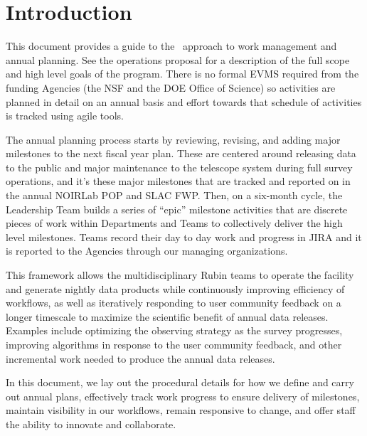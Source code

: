\section{Introduction}

This document provides a guide to the \VRO\ approach to work management and annual planning.
See the operations proposal  for a description of the full scope and high level goals of the program.
There is no formal \gls{EVMS} required from the funding Agencies (the \gls{NSF} and the \gls{DOE} Office of Science) so activities are planned in detail on an annual basis and effort towards that schedule of activities is tracked using agile tools.

The annual planning process starts by reviewing, revising, and adding major milestones to the next fiscal year plan.
These are centered around releasing data to the public and major maintenance to the telescope system during full survey operations, and it's these major milestones that are tracked and reported on in the annual \gls{NOIRLab} \gls{POP} and \gls{SLAC} \gls{FWP}.
Then, on a six-month \gls{cycle}, the Leadership Team builds a series of ``epic'' milestone activities that are discrete pieces of work within Departments and Teams to collectively deliver the high level milestones.
Teams record their day to day work and progress in \gls{JIRA} and it is reported to the Agencies through our managing organizations.

This framework allows the multidisciplinary Rubin teams to operate the facility and generate nightly data products while continuously improving efficiency of workflows,
as well as iteratively responding to user community feedback on a longer timescale to maximize the scientific benefit of annual data releases.
Examples include optimizing the observing strategy as the survey progresses, improving algorithms in response to the user community feedback,
and other incremental work needed to produce the annual data releases.

In this document, we lay out the procedural details for how we define and carry out annual plans, effectively track work progress to ensure delivery of milestones, maintain visibility in our workflows, remain responsive to change, and offer staff the ability to innovate and collaborate.


